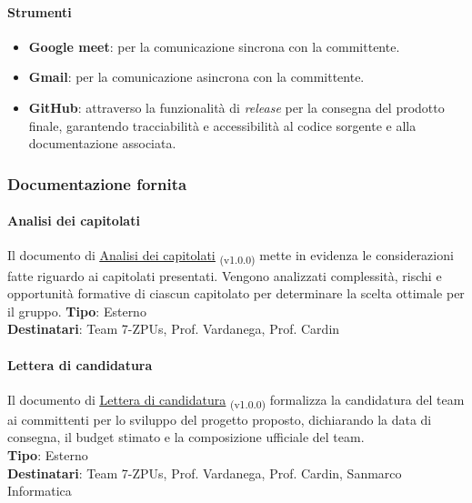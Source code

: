 \documentclass[a4paper,12pt]{article}
\newcommand{\ped}[1]{\textsubscript{#1}}
\begin{document}
\paragraph{Strumenti}
\begin{itemize}
    \item \textbf{Google meet}: per la comunicazione sincrona con la committente.
    \item \textbf{Gmail}: per la comunicazione asincrona con la committente.
    \item \textbf{GitHub}: attraverso la funzionalità di \textit{release} per la consegna del prodotto finale, garantendo tracciabilità e accessibilità al codice sorgente e alla documentazione associata.
\end{itemize}

\subsubsection{Documentazione fornita}

\paragraph{Analisi dei capitolati}\label{analisiDeiCapitolati}
Il documento di
\href{https://7-zpus.github.io/Docs/assets/1_Candidatura/AnalisiCapitolati.pdf}{\ul{Analisi
        dei capitolati}} \ped{(v1.0.0)} mette in
evidenza le considerazioni fatte riguardo ai capitolati presentati. Vengono
analizzati complessità, rischi e opportunità formative di ciascun capitolato
per determinare la scelta ottimale per il gruppo. \textbf{Tipo}: Esterno \\
\textbf{Destinatari}: Team 7-ZPUs, Prof. Vardanega, Prof. Cardin \\

\paragraph{Lettera di candidatura}\label{letteraDiCandidatura}
Il documento di
\href{https://7-zpus.github.io/Docs/assets/1_Candidatura/LetteraDiPresentazione.pdf}{\ul{Lettera
        di candidatura}} \ped{(v1.0.0)}
formalizza la candidatura del team ai committenti per lo sviluppo del progetto
proposto, dichiarando la data di consegna, il budget stimato e la composizione
ufficiale del team. \\ \textbf{Tipo}: Esterno \\ \textbf{Destinatari}: Team
7-ZPUs, Prof. Vardanega, Prof. Cardin, Sanmarco Informatica \\
\end{document}
